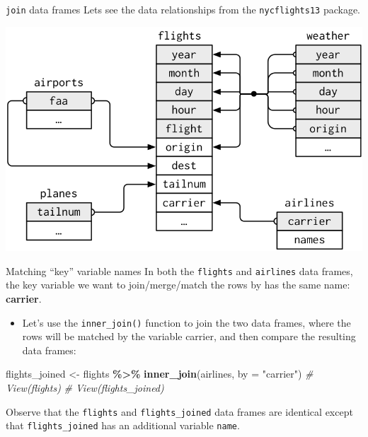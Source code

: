 \documentclass[
  ignorenonframetext,
]{beamer}
\newenvironment{Shaded}{\begin{snugshade}}{\end{snugshade}}
\newcommand{\AttributeTok}[1]{\textcolor[rgb]{0.13,0.29,0.53}{#1}}
\newcommand{\CommentTok}[1]{\textcolor[rgb]{0.56,0.35,0.01}{\textit{#1}}}
\newcommand{\FunctionTok}[1]{\textcolor[rgb]{0.13,0.29,0.53}{\textbf{#1}}}
\newcommand{\NormalTok}[1]{#1}
\newcommand{\OtherTok}[1]{\textcolor[rgb]{0.56,0.35,0.01}{#1}}
\newcommand{\SpecialCharTok}[1]{\textcolor[rgb]{0.81,0.36,0.00}{\textbf{#1}}}
\newcommand{\StringTok}[1]{\textcolor[rgb]{0.31,0.60,0.02}{#1}}
\providecommand{\tightlist}{%
  \setlength{\itemsep}{0pt}\setlength{\parskip}{0pt}}
\begin{document}
\begin{frame}[fragile]{\texttt{join} data frames}
\protect\hypertarget{join-data-frames-1}{}
Lets see the data relationships from the \texttt{nycflights13} package.

\begin{center}\includegraphics[width=0.8\linewidth,height=0.6\textheight]{week3_5} \end{center}
\end{frame}

\begin{frame}[fragile]{Matching ``key'' variable names}
\protect\hypertarget{matching-key-variable-names}{}
In both the \texttt{flights} and \texttt{airlines} data frames, the key
variable we want to join/merge/match the rows by has the same name:
\textbf{carrier}.

\begin{itemize}
\tightlist
\item
  Let's use the \texttt{inner\_join()} function to join the two data
  frames, where the rows will be matched by the variable carrier, and
  then compare the resulting data frames:
\end{itemize}

\normalsize

\begin{Shaded}
\begin{Highlighting}[]
\NormalTok{flights\_joined }\OtherTok{\textless{}{-}}\NormalTok{ flights }\SpecialCharTok{\%\textgreater{}\%} 
  \FunctionTok{inner\_join}\NormalTok{(airlines, }\AttributeTok{by =} \StringTok{"carrier"}\NormalTok{)}
\CommentTok{\# View(flights)}
\CommentTok{\# View(flights\_joined)}
\end{Highlighting}
\end{Shaded}

\normalsize

Observe that the \texttt{flights} and \texttt{flights\_joined} data
frames are identical except that \texttt{flights\_joined} has an
additional variable \texttt{name}.
\end{frame}
\end{document}
